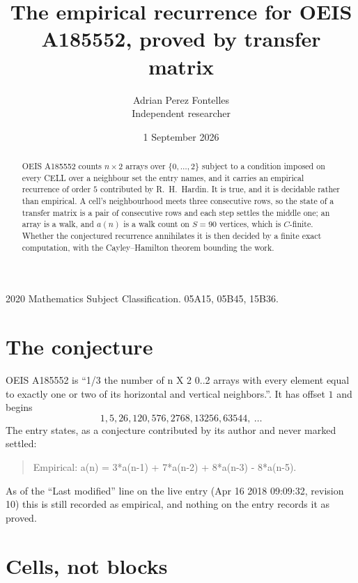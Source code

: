 \documentclass[11pt,a4paper]{article}
\title{The empirical recurrence for OEIS A185552, proved by transfer matrix}
\author{Adrian Perez Fontelles\\ \small Independent researcher}
\date{1 September 2026}
\theoremstyle{plain}
\theoremstyle{definition}
\begin{document}
\maketitle

\begin{abstract}
OEIS A185552 counts $n\times2$ arrays over $\{0,\dots,2\}$ subject to a condition imposed on
every CELL over a neighbour set the entry names, and it carries an empirical recurrence of
order $5$ contributed by R.~H.~Hardin. It is true, and it is decidable rather than
empirical. A cell's neighbourhood meets three consecutive rows, so the state of a transfer
matrix is a pair of consecutive rows and each step settles the middle one; an array is a
walk, and $a(n)$ is a walk count on $S=90$ vertices, which is $C$-finite. Whether the
conjectured recurrence annihilates it is then decided by a finite exact computation, with the
Cayley--Hamilton theorem bounding the work.
\end{abstract}

\noindent\small 2020 Mathematics Subject Classification. 05A15, 05B45, 15B36.\normalsize

\section{The conjecture}

OEIS A185552 is ``1/3 the number of n X 2 0..2 arrays with every element equal to exactly one or two of its horizontal and vertical neighbors.''. It has offset $1$ and begins
\[
1, 5, 26, 120, 576, 2768, 13256, 63544,\ \dots
\]
The entry states, as a conjecture contributed by its author and never marked settled:
\begin{quote}
Empirical: a(n) = 3*a(n-1) + 7*a(n-2) + 8*a(n-3) - 8*a(n-5).
\end{quote}
As of the ``Last modified'' line on the live entry (Apr 16 2018 09:09:32, revision 10) this is still
recorded as empirical, and nothing on the entry records it as proved.

\section{Cells, not blocks}
\end{document}
